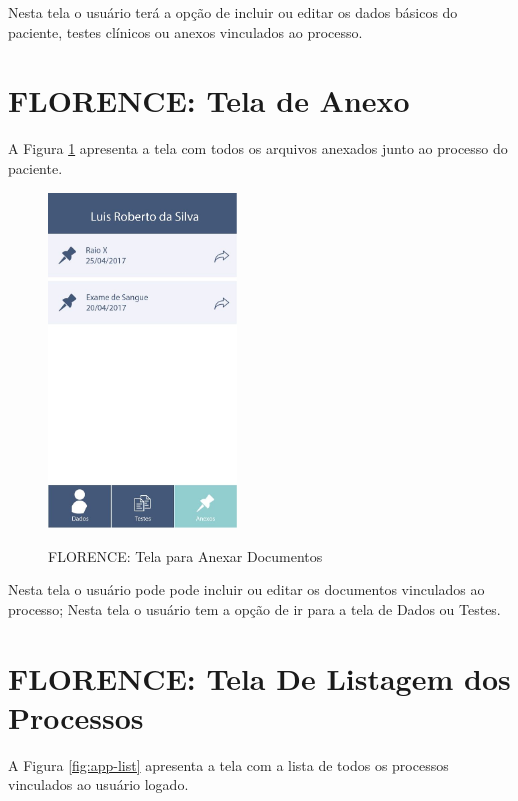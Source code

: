 \documentclass[portuguese,oneside]{tcc}
\begin{document}
Nesta tela o usuário terá a opção de incluir ou editar os dados básicos do paciente, testes clínicos ou anexos vinculados ao processo.


\section{FLORENCE: Tela de Anexo}
A Figura \ref{fig:app-anexo} apresenta a tela com todos os arquivos anexados junto ao processo do paciente.

\begin{figure}[htp]
\centering
\caption{FLORENCE: Tela para Anexar Documentos}
\includegraphics[width=5cm]{app-attachment}
\label{fig:app-anexo}
\end{figure}

Nesta tela o usuário pode pode incluir ou editar os documentos vinculados ao processo; Nesta tela o usuário tem a opção de ir para a tela de Dados ou Testes.


\section{FLORENCE: Tela De Listagem dos Processos}
A Figura \ref{fig:app-list} apresenta a tela com a lista de todos os processos vinculados ao usuário logado.
\end{document}
